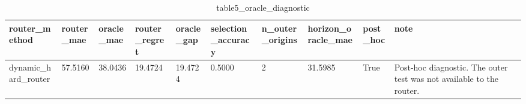 \begin{table}[t]
\centering
\begin{tabular}{llllllllll}
\hline
router\_method & router\_mae & oracle\_mae & router\_regret & oracle\_gap & selection\_accuracy & n\_outer\_origins & horizon\_oracle\_mae & post\_hoc & note \\
\hline
dynamic\_hard\_router & 57.5160 & 38.0436 & 19.4724 & 19.4724 & 0.5000 & 2 & 31.5985 & True & Post-hoc diagnostic. The outer test was not available to the router. \\
\hline
\end{tabular}
\caption{table5\_oracle\_diagnostic}
\end{table}
